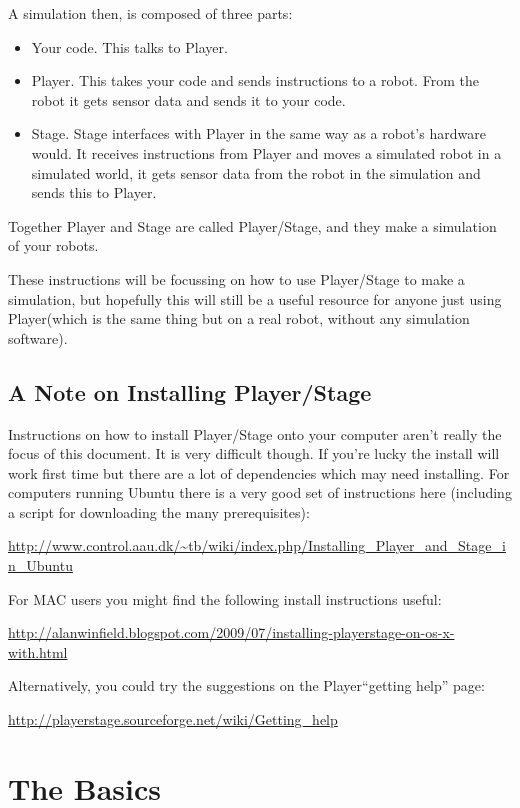 \documentclass[a4paper]{report}
\newcommand{\plst}{Player/Stage\xspace}
\newcommand{\pl}{Player\xspace}
\begin{document}
A simulation then, is composed of three parts:
\begin{itemize}
\item Your code. This talks to \pl.
\item \pl. This takes your code and sends instructions to a robot. From the robot it gets sensor data and sends it to your code.
\item Stage. Stage interfaces with \pl in the same way as a robot's hardware would. It receives instructions from \pl and moves a simulated robot in a simulated world, it gets sensor data from the robot in the simulation and sends this to \pl.
\end{itemize}
Together \pl and Stage are called \plst, and they make a simulation of your robots.

These instructions will be focussing on how to use \plst to make a simulation, but hopefully this will still be a useful resource for anyone just using \pl (which is the same thing but on a real robot, without any simulation software).

\section{A Note on Installing \plst}
Instructions on how to install \plst onto your computer aren't really the focus of this document. It is very difficult though. If you're lucky the install will work first time but there are a lot of dependencies which may need installing. For computers running Ubuntu there is a very good set of instructions here (including a script for downloading the many prerequisites):
\begin{center}
\url{http://www.control.aau.dk/~tb/wiki/index.php/Installing_Player_and_Stage_in_Ubuntu}
\end{center}
For MAC users you might find the following install instructions useful:
\begin{center}
\url{http://alanwinfield.blogspot.com/2009/07/installing-playerstage-on-os-x-with.html}
\end{center}
Alternatively, you could try the suggestions on the \pl ``getting help'' page:
\begin{center}
	\url{http://playerstage.sourceforge.net/wiki/Getting_help}
\end{center}

\chapter{The Basics}
\end{document}
